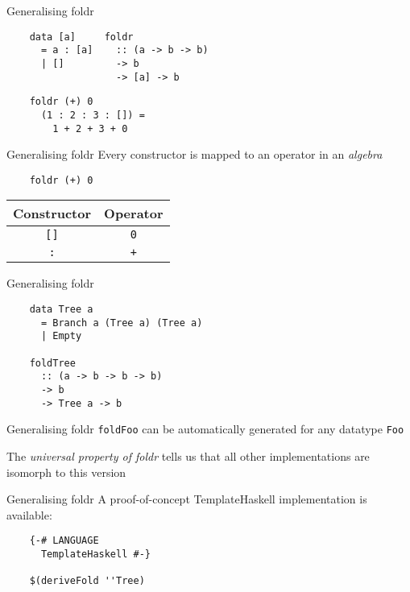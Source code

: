 \documentclass[20pt]{beamer}
\newcommand{\vspaced}{
    \vspace{5mm}
}
\begin{document}
\begin{frame}[fragile]{Generalising foldr}
    \begin{lstlisting}
    data [a]     foldr
      = a : [a]    :: (a -> b -> b)
      | []         -> b
                   -> [a] -> b
    \end{lstlisting}

    \begin{lstlisting}
    foldr (+) 0
      (1 : 2 : 3 : []) =
        1 + 2 + 3 + 0
    \end{lstlisting}
\end{frame}

\begin{frame}[fragile]{Generalising foldr}
    Every constructor is mapped to an operator in an \emph{algebra} \\
    \vspaced
    \begin{lstlisting}
    foldr (+) 0
    \end{lstlisting}
    \vspaced
    \begin{tabular}{c|c}
        \textbf{Constructor} & \textbf{Operator} \\
        \hline
        \texttt{[]}          & \texttt{0}        \\
        \texttt{:}           & \texttt{+}        \\
    \end{tabular}
\end{frame}

\begin{frame}[fragile]{Generalising foldr}
    \begin{lstlisting}
    data Tree a
      = Branch a (Tree a) (Tree a)
      | Empty

    foldTree
      :: (a -> b -> b -> b)
      -> b
      -> Tree a -> b
    \end{lstlisting}
\end{frame}

\begin{frame}{Generalising foldr}
    \texttt{foldFoo} can be automatically generated for any datatype
    \texttt{Foo} \\
    \vspaced
    The \emph{universal property of foldr} tells us that all other
    implementations are isomorph to this version
\end{frame}

\begin{frame}[fragile]{Generalising foldr}
    A proof-of-concept TemplateHaskell implementation is available: \\
    \vspaced
    \begin{lstlisting}
    {-# LANGUAGE
      TemplateHaskell #-}

    $(deriveFold ''Tree)
    \end{lstlisting}
\end{frame}
\end{document}
